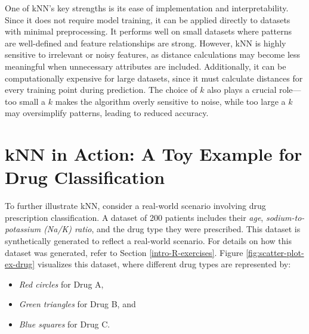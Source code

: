 \documentclass[
]{book}
\providecommand{\tightlist}{%
  \setlength{\itemsep}{0pt}\setlength{\parskip}{0pt}}
\theoremstyle{definition}
\theoremstyle{definition}
\theoremstyle{definition}
\theoremstyle{definition}
\theoremstyle{remark}
\begin{document}
One of kNN's key strengths is its ease of implementation and interpretability. Since it does not require model training, it can be applied directly to datasets with minimal preprocessing. It performs well on small datasets where patterns are well-defined and feature relationships are strong. However, kNN is highly sensitive to irrelevant or noisy features, as distance calculations may become less meaningful when unnecessary attributes are included. Additionally, it can be computationally expensive for large datasets, since it must calculate distances for every training point during prediction. The choice of \(k\) also plays a crucial role---too small a \(k\) makes the algorithm overly sensitive to noise, while too large a \(k\) may oversimplify patterns, leading to reduced accuracy.

\section*{kNN in Action: A Toy Example for Drug Classification}\label{knn-in-action-a-toy-example-for-drug-classification}

To further illustrate kNN, consider a real-world scenario involving drug prescription classification. A dataset of 200 patients includes their \emph{age}, \emph{sodium-to-potassium (Na/K) ratio}, and the drug type they were prescribed. This dataset is synthetically generated to reflect a real-world scenario. For details on how this dataset was generated, refer to Section \ref{intro-R-exercises}. Figure \ref{fig:scatter-plot-ex-drug} visualizes this dataset, where different drug types are represented by:

\begin{itemize}
\tightlist
\item
  \emph{Red circles} for Drug A,\\
\item
  \emph{Green triangles} for Drug B, and\\
\item
  \emph{Blue squares} for Drug C.
\end{itemize}
\end{document}
